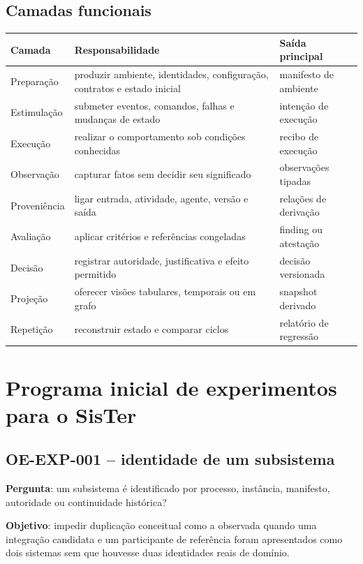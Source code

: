 \documentclass[11pt,a4paper,oneside]{article}
\begin{document}
\subsection{Camadas funcionais}

\begin{longtable}{P{3.2cm}P{6.0cm}P{3.9cm}}
\toprule
\textbf{Camada} & \textbf{Responsabilidade} & \textbf{Saída principal} \\
\midrule
\endhead
Preparação & produzir ambiente, identidades, configuração, contratos e estado inicial & manifesto de ambiente \\
Estimulação & submeter eventos, comandos, falhas e mudanças de estado & intenção de execução \\
Execução & realizar o comportamento sob condições conhecidas & recibo de execução \\
Observação & capturar fatos sem decidir seu significado & observações tipadas \\
Proveniência & ligar entrada, atividade, agente, versão e saída & relações de derivação \\
Avaliação & aplicar critérios e referências congeladas & finding ou atestação \\
Decisão & registrar autoridade, justificativa e efeito permitido & decisão versionada \\
Projeção & oferecer visões tabulares, temporais ou em grafo & snapshot derivado \\
Repetição & reconstruir estado e comparar ciclos & relatório de regressão \\
\bottomrule
\end{longtable}

\section{Programa inicial de experimentos para o SisTer}

\subsection{OE-EXP-001 -- identidade de um subsistema}

\textbf{Pergunta}: um subsistema é identificado por processo, instância, manifesto, autoridade ou continuidade histórica?

\textbf{Objetivo}: impedir duplicação conceitual como a observada quando uma integração candidata e um participante de referência foram apresentados como dois sistemas sem que houvesse duas identidades reais de domínio.
\end{document}
